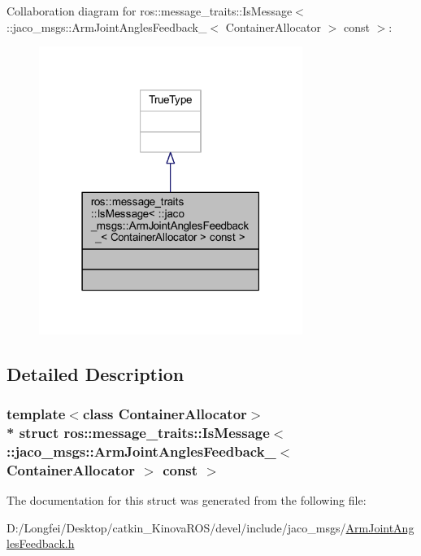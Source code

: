 Collaboration diagram for ros\+:\+:message\+\_\+traits\+:\+:Is\+Message$<$ \+:\+:jaco\+\_\+msgs\+:\+:Arm\+Joint\+Angles\+Feedback\+\_\+$<$ Container\+Allocator $>$ const $>$\+:
\nopagebreak
\begin{figure}[H]
\begin{center}
\leavevmode
\includegraphics[width=243pt]{d6/d64/structros_1_1message__traits_1_1IsMessage_3_01_1_1jaco__msgs_1_1ArmJointAnglesFeedback___3_01Con2adf0d208ad7429890715e2428c05908}
\end{center}
\end{figure}


\subsection{Detailed Description}
\subsubsection*{template$<$class Container\+Allocator$>$\\*
struct ros\+::message\+\_\+traits\+::\+Is\+Message$<$ \+::jaco\+\_\+msgs\+::\+Arm\+Joint\+Angles\+Feedback\+\_\+$<$ Container\+Allocator $>$ const  $>$}



The documentation for this struct was generated from the following file\+:\begin{DoxyCompactItemize}
\item 
D\+:/\+Longfei/\+Desktop/catkin\+\_\+\+Kinova\+R\+O\+S/devel/include/jaco\+\_\+msgs/\hyperlink{ArmJointAnglesFeedback_8h}{Arm\+Joint\+Angles\+Feedback.\+h}\end{DoxyCompactItemize}
